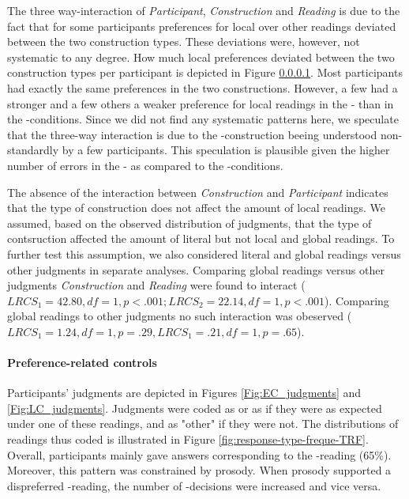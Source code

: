 \documentclass[fleqn,reqno,10pt,draft]{article}
\newcommand{\as}{\acro{as}}
\renewcommand{\es}{\acro{es}}
\newcommand{\lc}{\acro{lc}}
\newcommand{\ec}{\acro{ec}}
\begin{document}
The three way-interaction of {\it Participant}, {\it Construction} and
{\it Reading} is due to the fact that for some participants
preferences for local over other readings deviated between the two
construction types. These deviations were, however, not systematic to
any degree. How much local preferences deviated between the two
construction types per participant is depicted in Figure \ref{}. Most
participants had exactly the same preferences in the two
constructions. However, a few had a stronger and a few others a weaker
preference for local readings in the \es- than in the
\as-conditions. Since we did not find any systematic patterns
here, we speculate that the three-way interaction is due to the
\es-construction beeing understood non-standardly by a
few participants. This speculation is plausible given the higher
number of errors in the \es- as compared to the \as-conditions.

The absence of the interaction between {\it Construction} and {\it
  Participant} indicates that the type of construction does not affect
the amount of local readings. We assumed, based on the observed
distribution of judgments, that the type of contsruction affected the
amount of literal but not local and global readings. To further test
this assumption, we also considered literal and global readings versus
other judgments in separate analyses. Comparing global readings versus
other judgments {\it Construction} and {\it Reading} were found to
interact ($LRCS_1=42.80, df= 1, p<.001; LRCS_2=22.14, df= 1,
p<.001$). Comparing global readings to other judgments no such
interaction was obeserved ($LRCS_1=1.24, df= 1, p=.29, LRCS_1=.21, df=
1, p=.65$).


\paragraph{Preference-related controls}

Participants' judgments are depicted in Figures \ref{Fig:EC_judgments}
and \ref{Fig:LC_judgments}. Judgments were coded as \ec or as \lc if
they were as expected under one of these readings, and as "other" if
they were not. The distributions of readings thus coded is illustrated
in Figure \ref{fig:response-type-freque-TRF}.  Overall, participants
mainly gave answers corresponding to the \lc-reading (65\%).
Moreover, this pattern was constrained by prosody. When prosody
supported a dispreferred \ec-reading, the number of \ec-decisions were
increased and vice versa.
\end{document}

